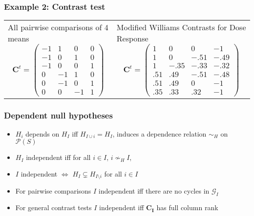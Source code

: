 \documentclass[bigger]{beamer}
\newcommand{\bs}[1]{\bm{#1}}
\begin{document}
\begin{frame}
\frametitle{Example 2: Contrast test}


\begin{tabular}{ll}
  \begin{minipage}{.45\textwidth}
    All pairwise comparisons of 4 means 
    \begin{displaymath}
    \bs{C}^t = \left(
      \begin{array}{llll}
      -1 & 1 & 0 & 0 \\
      -1 & 0 & 1 & 0 \\
      -1 & 0 & 0 & 1 \\
      0 & -1 & 1 & 0 \\
      0 & -1 & 0 & 1 \\
      0 & 0 & -1 & 1 
    \end{array}
    \right)
    \end{displaymath}
  \end{minipage} &
  \begin{minipage}{.55\textwidth}
    Modified Williams Contrasts for Dose Response
    \begin{displaymath}
      \bs{C}^t=\left(
      \begin{array}{llll}
        1 & 0 & 0 & -1\\
        1 & 0 &-.51 & -.49 \\
        1 & -.35 & -.33 & -.32\\
        .51 & .49 & -.51 & -.48\\
        .51 & .49 & 0 &  -1\\
        .35 & .33 & .32& -1
      \end{array}\right)
    \end{displaymath}
  \end{minipage}
\end{tabular}

\end{frame}



\begin{frame}
\frametitle{Dependent null hypotheses}

\begin{itemize}
\item $H_i$ depends on $H_I$ iff $H_{I \cup i} = H_{I}$, induces a
  dependence relation $\sim_H$ on $\mathcal{P}(S)$
\item $H_I$ independent iff for all $i \in I$, $i \nsim_H I$,
\item $I$ independent $\Leftrightarrow$ $H_{I} \subsetneq
  H_{I\setminus i}$ for all $i \in I$
\pause
\item For pairwise comparisons $I$ independent iff there are no cycles in $\mathscr{G}_I$
\item For general contrast tests $I$ independent iff $\bs{C_I}$ has full
  column rank
\end{itemize} %
\end{frame}
\end{document}
